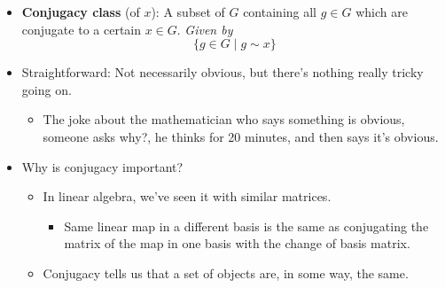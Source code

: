 \documentclass[../notes.tex]{subfiles}
\begin{document}
\begin{itemize}
\begin{enumerate}[label={(\Roman*)}]
        \begin{proof}
            Suppose $y=gxg^{-1}$ and $z=hyh^{-1}$. Then
            \begin{equation*}
                z = hgxg^{-1}h^{-1}
                = (hg)x(hg)^{-1}
            \end{equation*}
        \end{proof}
    \end{enumerate}
    \item \textbf{Conjugacy class} (of $x$): A subset of $G$ containing all $g\in G$ which are conjugate to a certain $x\in G$. \emph{Given by}
    \begin{equation*}
        \{g\in G\mid g\sim x\}
    \end{equation*}
    \item Straightforward: Not necessarily obvious, but there's nothing really tricky going on.
    \begin{itemize}
        \item The joke about the mathematician who says something is obvious, someone asks why?, he thinks for 20 minutes, and then says it's obvious.
    \end{itemize}
    \item Why is conjugacy important?
    \begin{itemize}
        \item In linear algebra, we've seen it with similar matrices.
        \begin{itemize}
            \item Same linear map in a different basis is the same as conjugating the matrix of the map in one basis with the change of basis matrix.
        \end{itemize}
        \item Conjugacy tells us that a set of objects are, in some way, the same.
    \end{itemize}
\end{itemize}
\end{document}
